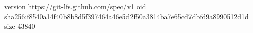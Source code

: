 version https://git-lfs.github.com/spec/v1
oid sha256:f8540a14f40b8b8d5f397464a46e5d2f50a3814ba7e65cd7dbfd9a8990512d1d
size 43840
